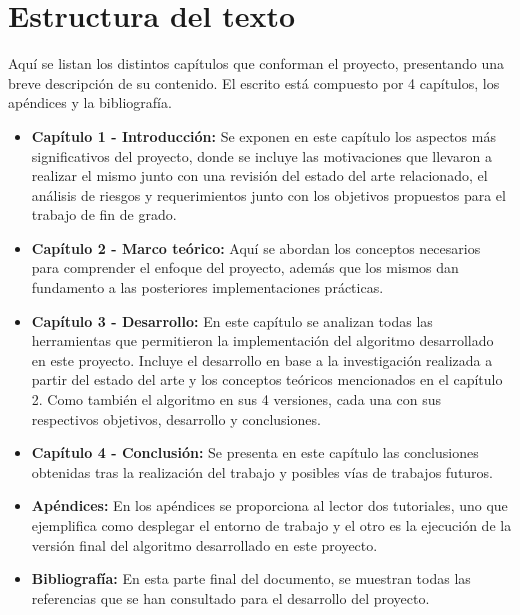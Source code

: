 \section{Estructura del texto}

Aquí se listan los distintos capítulos que conforman el proyecto, presentando una breve descripción de su contenido. El escrito está compuesto por 4 capítulos, los apéndices y la bibliografía.


\begin{itemize}   
    \item \textbf{Capítulo 1 - Introducción:} Se exponen en este capítulo los aspectos más significativos del proyecto, donde se incluye las motivaciones que llevaron a realizar el mismo junto con una revisión del estado del arte relacionado, el análisis de riesgos y requerimientos junto con los objetivos propuestos para el trabajo de fin de grado.
    
    \item \textbf{Capítulo 2 - Marco teórico:} Aquí se abordan los conceptos necesarios para comprender el enfoque del proyecto, además que los mismos dan fundamento a las posteriores implementaciones prácticas.
    
    \item \textbf{Capítulo 3 - Desarrollo:} En este capítulo se analizan todas las herramientas que permitieron la implementación del algoritmo desarrollado en este proyecto. Incluye el desarrollo en base a la investigación realizada a partir del estado del arte y los conceptos teóricos mencionados en el capítulo 2. Como también el algoritmo en sus 4 versiones, cada una con sus respectivos objetivos, desarrollo y conclusiones.
    
    \item \textbf{Capítulo 4 - Conclusión:} Se presenta en este capítulo las conclusiones obtenidas tras la realización del trabajo y posibles vías de trabajos futuros.
	
	\item \textbf{Apéndices:} En los apéndices se proporciona al lector dos tutoriales, uno que ejemplifica como desplegar el entorno de trabajo y el otro es la ejecución de la versión final del algoritmo desarrollado en este proyecto.
    
    \item \textbf{Bibliografía:} En esta parte final del documento, se muestran todas las referencias que se han consultado para el desarrollo del proyecto.
    
\end{itemize}